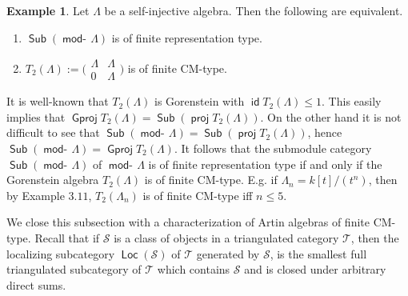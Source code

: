 \documentclass[oneside, a4paper,reqno]{amsart}
\numberwithin{equation}{section}
\theoremstyle{definition}
\newtheorem{exam}[thm]{Example}
\begin{document}
\begin{exam} Let $\Lambda$ be a self-injective algebra. Then the
following are equivalent.
\begin{enumerate}
\item $\operatorname*{\mathsf{Sub}}(\operatorname*{\mathsf{mod}-\!}\Lambda)$ is of finite representation type.
\item $T_{2}(\Lambda) := \bigl(\begin{smallmatrix} \Lambda & \Lambda\\
0 & \Lambda
\end{smallmatrix}\bigr)$ is of finite CM-type.
\end{enumerate}
It is well-known that $T_{2}(\Lambda)$ is Gorenstein with $\operatorname*{\mathsf{id}}
T_{2}(\Lambda) \leq 1$. This easily implies that ${\operatorname{\mathsf{Gproj}}\nolimits}
T_{2}(\Lambda) = \operatorname*{\mathsf{Sub}}(\operatorname*{\mathsf{proj}} T_{2}(\Lambda))$. On the other hand it
is not difficult to see that $\operatorname*{\mathsf{Sub}}(\operatorname*{\mathsf{mod}-\!}\Lambda) = \operatorname*{\mathsf{Sub}}(\operatorname*{\mathsf{proj}}
T_{2}(\Lambda))$, hence $\operatorname*{\mathsf{Sub}}(\operatorname*{\mathsf{mod}-\!}\Lambda) = {\operatorname{\mathsf{Gproj}}\nolimits}
T_{2}(\Lambda)$. It follows that the submodule category
$\operatorname*{\mathsf{Sub}}(\operatorname*{\mathsf{mod}-\!}\Lambda)$ of $\operatorname*{\mathsf{mod}-\!}\Lambda$ is of finite representation
type if and only if the Gorenstein algebra $T_{2}(\Lambda)$ is of
finite CM-type. E.g. if $\Lambda_{n} = k[t]/(t^{n})$, then by
Example $3.11$,  $T_{2}(\Lambda_{n})$ is of finite CM-type iff $n
\leq 5$.
\end{exam}

We close this subsection with a characterization of Artin algebras
of finite CM-type. Recall that if $\mathcal S$ is a class of objects
in a triangulated category ${\mathcal T}$, then the localizing subcategory
$\operatorname*{\mathsf{Loc}}(\mathcal S)$ of ${\mathcal T}$ generated by $\mathcal S$, is the
smallest full triangulated subcategory of ${\mathcal T}$ which contains
$\mathcal S$ and is closed under arbitrary direct sums.
\end{document}
